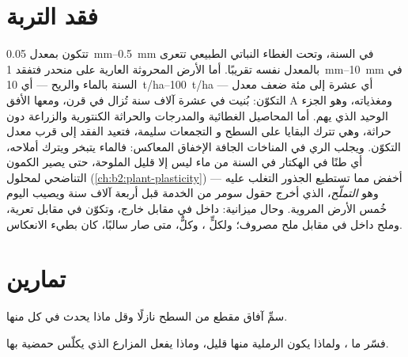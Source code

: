 \section{فقد التربة}

\begin{proposition}\label{prop:b2:living-soil:erosion}
تتكون  بمعدل \qtyrange{0.05}{0.5}{mm} في السنة، وتحت الغطاء
النباتي الطبيعي تتعرى بالمعدل نفسه تقريبًا. أما الأرض المحروثة العارية على
منحدر فتفقد \qtyrange{1}{10}{mm} في السنة بالماء والريح ---
أي \qtyrange{10}{100}{t/ha} --- أي عشرة إلى مئة ضعف معدل
التكوّن:  بُنيت في عشرة آلاف سنة تُزال في
قرن، ومعها  الأفق A ومغذياته،
وهو الجزء الوحيد الذي يهم. أما المحاصيل الغطائية والمدرجات والحراثة الكنتورية
والزراعة دون حراثة، وهي تترك البقايا على السطح و
التجمعات سليمة، فتعيد الفقد إلى قرب معدل التكوّن.
ويجلب الري في المناخات الجافة الإخفاق المعاكس: فالماء
يتبخر ويترك أملاحه، أي طنًا في الهكتار في السنة من
ماء ليس إلا قليل الملوحة، حتى يصير الكمون التناضحي
لمحلول  (\cref{ch:b2:plant-plasticity}) أخفض مما
تستطيع الجذور التغلب عليه --- وهو \emph{التملّح}، الذي أخرج
حقول سومر من الخدمة قبل أربعة آلاف سنة ويصيب اليوم خُمس
الأرض المروية. وحال  ميزانية:  داخل في مقابل
 خارج، وتكوّن في مقابل تعرية، وملح داخل في مقابل ملح
مصروف؛ ولكلٍّ ، وكلٌّ، متى صار سالبًا، كان
بطيء الانعكاس.
\end{proposition}

\section{تمارين}

\begin{exercise}[$\star$]\label{exo:b2:living-soil:1}
سمِّ آفاق مقطع  من السطح نازلًا وقل
ماذا يحدث في كل منها.
\end{exercise}

\begin{exercise}[$\star$]\label{exo:b2:living-soil:2}
فسّر ما ، ولماذا يكون  الرملية
منها قليل، وماذا يفعل المزارع الذي يكلّس  حمضية بها.
\end{exercise}

